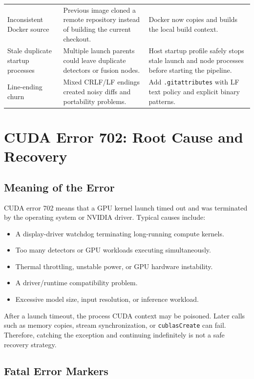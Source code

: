 \documentclass[11pt,a4paper]{article}
\begin{document}
\begin{longtable}{p{} p{} p{}}
Inconsistent Docker source & Previous image cloned a remote repository instead of building the current checkout. & Docker now copies and builds the local build context. \\
Stale duplicate startup processes & Multiple launch parents could leave duplicate detectors or fusion nodes. & Host startup profile safely stops stale launch and node processes before starting the pipeline. \\
Line-ending churn & Mixed CRLF/LF endings created noisy diffs and portability problems. & Add \texttt{.gitattributes} with LF text policy and explicit binary patterns. \\
\bottomrule
\end{longtable}

\section{CUDA Error 702: Root Cause and Recovery}

\subsection{Meaning of the Error}

CUDA error 702 means that a GPU kernel launch timed out and was terminated by the operating system or NVIDIA driver. Typical causes include:

\begin{itemize}
  \item A display-driver watchdog terminating long-running compute kernels.
  \item Too many detectors or GPU workloads executing simultaneously.
  \item Thermal throttling, unstable power, or GPU hardware instability.
  \item A driver/runtime compatibility problem.
  \item Excessive model size, input resolution, or inference workload.
\end{itemize}

After a launch timeout, the process CUDA context may be poisoned. Later calls such as memory copies, stream synchronization, or \texttt{cublasCreate} can fail. Therefore, catching the exception and continuing indefinitely is not a safe recovery strategy.

\subsection{Fatal Error Markers}
\end{document}
